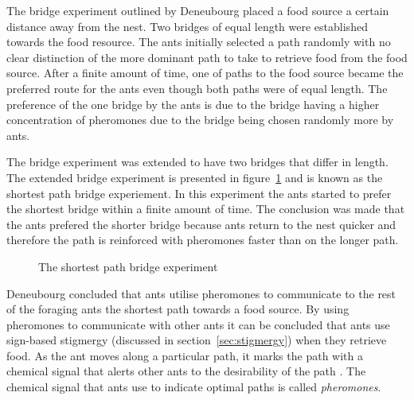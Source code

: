 The bridge experiment outlined by Deneubourg placed a food source a certain distance away from the nest\cite{AntsAndStigmergy,CompuIntelligenceIntro}. Two bridges of equal length were established towards the food resource. The ants initially selected a path randomly with no clear distinction of the more dominant path to take to retrieve food from the food source\cite{AntsAndStigmergy,CompuIntelligenceIntro}. After a finite amount of time, one of paths to the food source became the preferred route for the ants even though both paths were of equal length. The preference of the one bridge by the ants is due to the bridge having a higher concentration of pheromones due to the bridge being chosen randomly more by ants. 

The bridge experiment was extended to have two bridges that differ in length. The extended bridge experiment is presented in figure~\ref{fig:antBridgeExperiment} and is known as the shortest path bridge experiement\cite{FundamentalSwarm}. In this experiment the ants started to prefer the shortest bridge within a finite amount of time\cite{FundamentalSwarm}. The conclusion was made that the ants prefered the shorter bridge because ants return to the nest quicker and therefore the path is reinforced with pheromones faster than on the longer path\cite{FundamentalSwarm}.

\begin{figure}[H]
	\centering
	\setlength \fboxsep{0pt}
	\setlength \fboxrule{0.5pt}
	\caption{The shortest path bridge experiment \cite{AntsAndStigmergy}}
	\label{fig:antBridgeExperiment}
\end{figure}
Deneubourg concluded that ants utilise pheromones to communicate to the rest of the foraging ants the shortest path towards a food source.\cite{FundamentalSwarm} By using pheromones to communicate with other ants it can be concluded that ants use sign-based stigmergy (discussed in section~\ref{sec:stigmergy}) when they retrieve food\cite{AntIntroTrends,AntsAndStigmergy,CompuIntelligenceIntro}. As the ant moves along a particular path, it marks the path with a chemical signal that alerts other ants to the desirability of the path \cite{CompuIntelligenceIntro}. The chemical signal that ants use to indicate optimal paths is called \emph{pheromones}\cite{AntsAndStigmergy,CompuIntelligenceIntro}.

